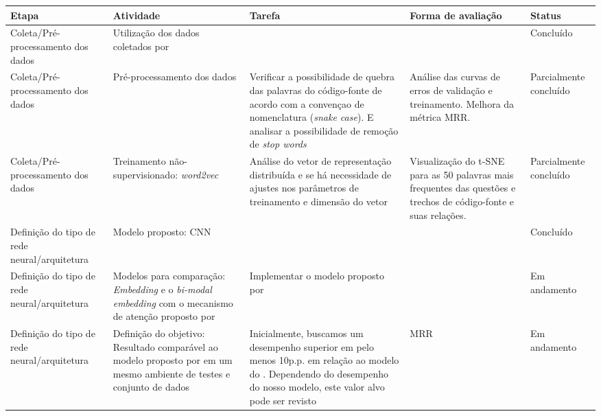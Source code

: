 {\footnotesize
\centering
\begin{longtable}{ p{8em} p{8em} p{10em} p{8em} p{6em} }
\hline
\textbf{Etapa} & \textbf{Atividade} & \textbf{Tarefa} & \textbf{Forma de avaliação} & \textbf{Status} \\
\hline
Coleta/Pré-processamento dos dados & Utilização dos dados coletados por \cite{yao-2018} & & & Concluído  \\
\hline

Coleta/Pré-processamento dos dados & Pré-processamento dos dados & Verificar a possibilidade de quebra das palavras do código-fonte de acordo com a convençao de nomenclatura (\textit{snake case}). E analisar a possibilidade de remoção de \textit{stop words} & Análise das curvas de erros de validação e treinamento. Melhora da métrica MRR. & Parcialmente concluído  \\
\hline

Coleta/Pré-processamento dos dados & Treinamento não-supervisionado: \textit{word2vec} & Análise do vetor de representação distribuída e se há necessidade de ajustes nos parâmetros de treinamento e dimensão do vetor & Visualização do t-SNE para as 50 palavras mais frequentes das questões e trechos de código-fonte e suas relações. & Parcialmente concluído  \\
\hline

Definição do tipo de rede neural/arquitetura & Modelo proposto: CNN & & & Concluído  \\
\hline

Definição do tipo de rede neural/arquitetura & Modelos para comparação: \textit{Embedding} e o \textit{bi-modal embedding} com o mecanismo de atenção proposto por \cite{cambronero-deep-learning-code-search:2019} & Implementar o modelo proposto por \cite{cambronero-deep-learning-code-search:2019} & & Em andamento  \\
\hline

Definição do tipo de rede neural/arquitetura & Definição do objetivo: Resultado comparável ao modelo proposto por \cite{cambronero-deep-learning-code-search:2019} em um mesmo ambiente de testes e conjunto de dados & Inicialmente, buscamos um desempenho superior em pelo menos 10p.p. em relação ao modelo do \cite{cambronero-deep-learning-code-search:2019}. Dependendo do desempenho do nosso modelo, este valor alvo pode ser revisto & MRR & Em andamento  \\
\hline


\end{longtable}}
